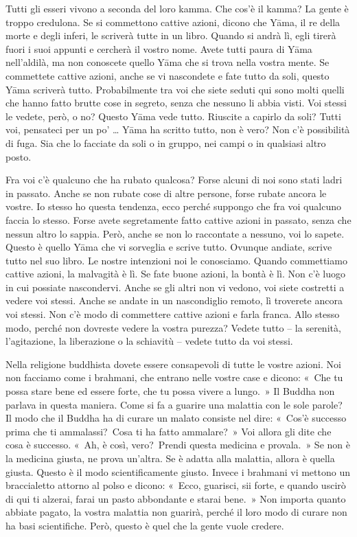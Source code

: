 Tutti gli esseri vivono a seconda del loro kamma. Che cos'è il
kamma? La gente è troppo credulona. Se si commettono cattive
azioni, dicono che Yāma, il re della morte e degli inferi, le scriverà
tutte in un libro. Quando si andrà lì, egli tirerà fuori i suoi appunti
e cercherà il vostro nome. Avete tutti paura di Yāma nell'aldilà, ma non
conoscete quello Yāma che si trova nella vostra mente. Se commettete
cattive azioni, anche se vi nascondete e fate tutto da soli, questo Yāma
scriverà tutto. Probabilmente tra voi che siete seduti qui sono molti
quelli che hanno fatto brutte cose in segreto, senza che nessuno li
abbia visti. Voi stessi le vedete, però, o no? Questo Yāma vede tutto.
Riuscite a capirlo da soli? Tutti voi, pensateci per un po' \ldots{} Yāma ha
scritto tutto, non è vero? Non c'è possibilità di fuga. Sia che lo
facciate da soli o in gruppo, nei campi o in qualsiasi altro posto.

Fra voi c'è qualcuno che ha rubato qualcosa? Forse alcuni di noi sono
stati ladri in passato. Anche se non rubate cose di altre persone, forse
rubate ancora le vostre. Io stesso ho questa tendenza, ecco perché
suppongo che fra voi qualcuno faccia lo stesso. Forse avete segretamente
fatto cattive azioni in passato, senza che nessun altro lo sappia. Però,
anche se non lo raccontate a nessuno, voi lo sapete. Questo è quello
Yāma che vi sorveglia e scrive tutto. Ovunque andiate, scrive tutto nel
suo libro. Le nostre intenzioni noi le conosciamo. Quando commettiamo
cattive azioni, la malvagità è lì. Se fate buone azioni, la bontà è lì.
Non c'è luogo in cui possiate nascondervi. Anche se gli altri non vi
vedono, voi siete costretti a vedere voi stessi. Anche se andate in un
nascondiglio remoto, lì troverete ancora voi stessi. Non c'è modo di
commettere cattive azioni e farla franca. Allo stesso modo, perché non
dovreste vedere la vostra purezza? Vedete tutto -- la serenità,
l'agitazione, la liberazione o la schiavitù -- vedete tutto da voi
stessi.

Nella religione buddhista dovete essere consapevoli di tutte le vostre
azioni. Noi non facciamo come i brahmani, che entrano nelle vostre case
e dicono: «~Che tu possa stare bene ed essere forte, che tu possa vivere
a lungo.~» Il Buddha non parlava in questa maniera. Come si fa a guarire
una malattia con le sole parole? Il modo che il Buddha ha di curare un
malato consiste nel dire: «~Cos'è successo prima che ti ammalassi?~Cosa
ti ha fatto ammalare?~» Voi allora gli dite che cosa è successo. «~Ah, è
così, vero?~Prendi questa medicina e provala.~» Se non è la medicina
giusta, ne prova un'altra. Se è adatta alla malattia, allora è quella
giusta. Questo è il modo scientificamente giusto. Invece i brahmani vi
mettono un braccialetto attorno al polso e dicono: «~Ecco, guarisci, sii
forte, e quando uscirò di qui ti alzerai, farai un pasto abbondante e
starai bene.~» Non importa quanto abbiate pagato, la vostra malattia non
guarirà, perché il loro modo di curare non ha basi scientifiche. Però,
questo è quel che la gente vuole credere.


